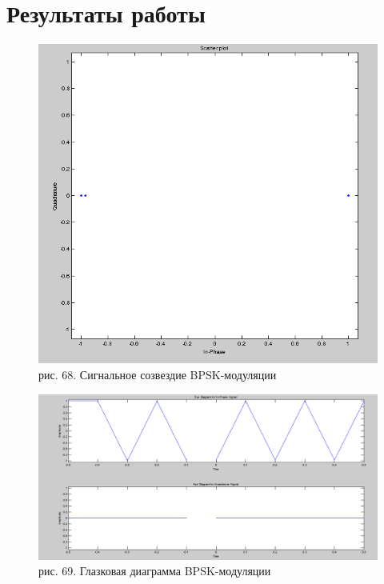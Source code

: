 \documentclass[10pt,a4paper]{report}
\begin{document}
\section{Результаты работы}
\begin{figure}
\begin{center}
\includegraphics[width=150mm, scale = 0.9]{9_1}\newline
рис. 68. Сигнальное созвездие BPSK-модуляции\newline
\end{center}
\end{figure}
\begin{figure}
\begin{center}
\includegraphics[width=150mm, scale = 0.9]{9_2}\newline
рис. 69. Глазковая диаграмма BPSK-модуляции\newline
\end{center}
\end{figure}
\end{document}
